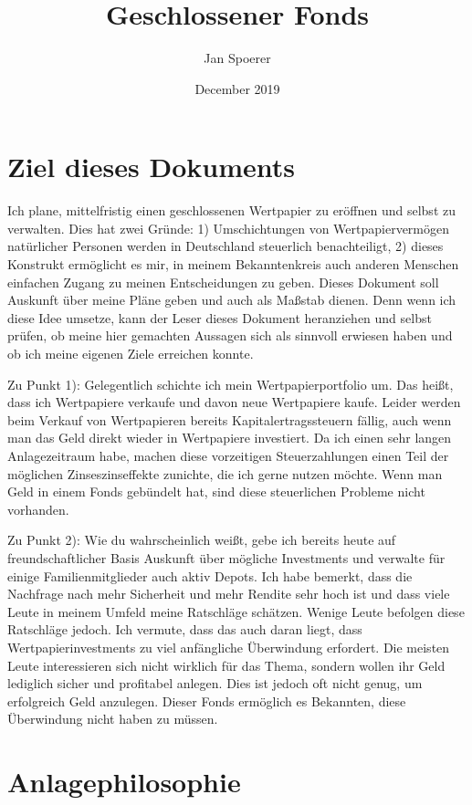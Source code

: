 \documentclass{article}
\title{Geschlossener Fonds}
\author{Jan Spoerer}
\date{December 2019}
\begin{document}
\maketitle

\section{Ziel dieses Dokuments}

Ich plane, mittelfristig einen geschlossenen Wertpapier zu eröffnen und selbst zu verwalten. Dies hat zwei Gründe: 1) Umschichtungen von Wertpapiervermögen natürlicher Personen werden in Deutschland steuerlich benachteiligt, 2) dieses Konstrukt ermöglicht es mir, in meinem Bekanntenkreis auch anderen Menschen einfachen Zugang zu meinen Entscheidungen zu geben. Dieses Dokument soll Auskunft über meine Pläne geben und auch als Maßstab dienen. Denn wenn ich diese Idee umsetze, kann der Leser dieses Dokument heranziehen und selbst prüfen, ob meine hier gemachten Aussagen sich als sinnvoll erwiesen haben und ob ich meine eigenen Ziele erreichen konnte.

Zu Punkt 1): Gelegentlich schichte ich mein Wertpapierportfolio um. Das heißt, dass ich Wertpapiere verkaufe und davon neue Wertpapiere kaufe. Leider werden beim Verkauf von Wertpapieren bereits Kapitalertragssteuern fällig, auch wenn man das Geld direkt wieder in Wertpapiere investiert. Da ich einen sehr langen Anlagezeitraum habe, machen diese vorzeitigen Steuerzahlungen einen Teil der möglichen Zinseszinseffekte zunichte, die ich gerne nutzen möchte. Wenn man Geld in einem Fonds gebündelt hat, sind diese steuerlichen Probleme nicht vorhanden.

Zu Punkt 2): Wie du wahrscheinlich weißt, gebe ich bereits heute auf freundschaftlicher Basis Auskunft über mögliche Investments und verwalte für einige Familienmitglieder auch aktiv Depots. Ich habe bemerkt, dass die Nachfrage nach mehr Sicherheit und mehr Rendite sehr hoch ist und dass viele Leute in meinem Umfeld meine Ratschläge schätzen. Wenige Leute befolgen diese Ratschläge jedoch. Ich vermute, dass das auch daran liegt, dass Wertpapierinvestments zu viel anfängliche Überwindung erfordert. Die meisten Leute interessieren sich nicht wirklich für das Thema, sondern wollen ihr Geld lediglich sicher und profitabel anlegen. Dies ist jedoch oft nicht genug, um erfolgreich Geld anzulegen. Dieser Fonds ermöglich es Bekannten, diese Überwindung nicht haben zu müssen.

\section{Anlagephilosophie}
\end{document}
